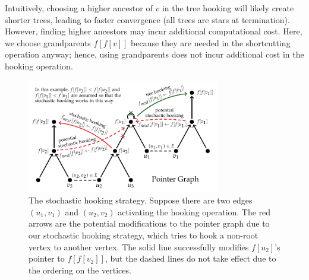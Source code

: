 \documentclass{sokendai_thesis} %
\begin{document}
Intuitively, choosing a higher ancestor of $v$ in the tree hooking will likely create shorter trees, leading to faster convergence (all trees are stars at termination).
However, finding higher ancestors may incur additional computational cost.  
Here, we choose grandparents $f[f[v]]$ because they are needed in the shortcutting operation anyway; hence, using grandparents does not incur additional cost in the hooking operation.

\begin{figure}
\centering
\includegraphics[width=0.75\textwidth]{figures/stochastic.pdf}
\caption{The stochastic hooking strategy.
Suppose there are two edges $(u_1,v_1)$ and $(u_2,v_2)$ activating the hooking operation.
The red arrows are the potential modifications to the pointer graph due to our stochastic hooking strategy, which tries to hook a non-root vertex to another vertex.
The solid line successfully modifies $f[u_2]$'s pointer to $f[f[v_2]]$, but the dashed lines do not take effect due to the ordering on the vertices.}
\label{fig:stochastic}
\vspace{-10pt}
\end{figure}
\end{document}
